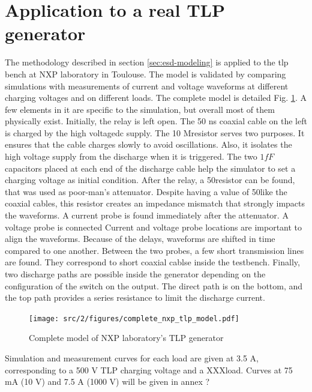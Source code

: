 \section{Application to a real TLP generator}
\label{sec:tlp-modeling}

The methodology described in section \ref{sec:esd-modeling} is applied to the \gls{tlp} bench at NXP laboratory in Toulouse.
The model is validated by comparing simulations with measurements of current and voltage waveforms at different charging voltages and on different loads.
The complete model is detailed Fig. \ref{fig:complete-tlp-model}.
A few elements in it are specific to the simulation, but overall most of them physically exist.
Initially, the relay is left open.
The 50 ns coaxial cable on the left is charged by the high voltage\gls{dc} supply.
The 10 M\textOmega resistor serves two purposes.
It ensures that the cable charges slowly to avoid oscillations.
Also, it isolates the high voltage supply from the discharge when it is triggered.
The two $1 fF$ capacitors placed at each end of the discharge cable help the simulator to set a charging voltage as initial condition.
After the relay, a 50\textOmega resistor can be found, that was used as poor-man's attenuator.
Despite having a value of 50\textOmega like the coaxial cables, this resistor creates an impedance mismatch that strongly impacts the waveforms.
A current probe is found immediately after the attenuator.
A voltage probe is connected
Current and voltage probe locations are important to align the waveforms.
Because of the delays, waveforms are shifted in time compared to one another.
Between the two probes, a few short transmission lines are found.
They correspond to short coaxial cablse inside the testbench.
Finally, two discharge paths are possible inside the generator depending on the configuration of the switch on the output.
The direct path is on the bottom, and the top path provides a series resistance to limit the discharge current.

\begin{figure}[!h]
  \centering
  \texttt{[image: src/2/figures/complete\_nxp\_tlp\_model.pdf]}
  \caption{Complete model of NXP laboratory's TLP generator}
  \label{fig:complete-tlp-model}
\end{figure}

Simulation and measurement curves for each load are given at 3.5 A, corresponding to a 500 V TLP charging voltage and a XXX\textOmega load.
Curves at 75 mA (10 V) and 7.5 A (1000 V) will be given in annex ?

